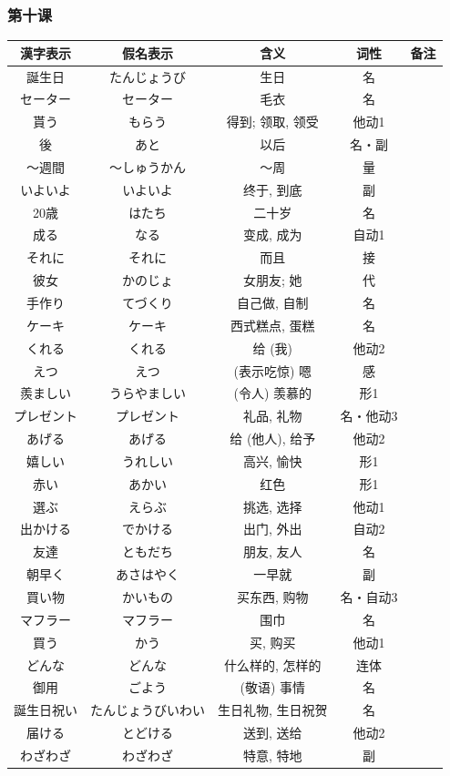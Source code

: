 \subsubsection{第十课}
\begin{longtable}{|c|c|c|c|c|}
    \hline
漢字表示 & 假名表示  & 含义 & 词性 & 备注 \\ \hline\hline  
誕生日 & たんじょうび & 生日 & 名 & \\ \hline
セーター & セーター & 毛衣 & 名 & \\ \hline
貰う & もらう & 得到; 领取, 领受 & 他动1 & \\ \hline
後 & あと & 以后 & 名・副 & \\ \hline
〜週間 & 〜しゅうかん & 〜周 & 量 & \\ \hline
いよいよ & いよいよ & 终于, 到底 & 副 & \\ \hline
20歳 & はたち & 二十岁 & 名 & \\ \hline
成る & なる & 变成, 成为 & 自动1 & \\ \hline
それに & それに & 而且 & 接 & \\ \hline
彼女 & かのじょ & 女朋友; 她 & 代 & \\ \hline
手作り & てづくり & 自己做, 自制 & 名 & \\ \hline
ケーキ & ケーキ & 西式糕点, 蛋糕 & 名 & \\ \hline
くれる & くれる & 给 (我) & 他动2 & \\ \hline
えつ & えつ & (表示吃惊) 嗯 & 感 & \\ \hline
羨ましい & うらやましい & (令人) 羡慕的 & 形1 & \\ \hline
プレゼント & プレゼント & 礼品, 礼物 & 名・他动3 & \\ \hline
あげる & あげる & 给 (他人), 给予 & 他动2 & \\ \hline
嬉しい & うれしい & 高兴, 愉快 & 形1 & \\ \hline
赤い & あかい & 红色 & 形1 & \\ \hline
選ぶ & えらぶ & 挑选, 选择 & 他动1 & \\ \hline
出かける & でかける & 出门, 外出 & 自动2 & \\ \hline
友達 & ともだち & 朋友, 友人 & 名 & \\ \hline
朝早く & あさはやく & 一早就 & 副 & \\ \hline
買い物 & かいもの & 买东西, 购物 & 名・自动3 & \\ \hline
マフラー & マフラー & 围巾 & 名 & \\ \hline
買う & かう & 买, 购买 & 他动1 & \\ \hline
どんな & どんな & 什么样的, 怎样的 & 连体 & \\ \hline
御用 & ごよう & (敬语) 事情 & 名 & \\ \hline
誕生日祝い & たんじょうびいわい & 生日礼物, 生日祝贺 & 名 & \\ \hline
届ける & とどける & 送到, 送给 & 他动2 & \\ \hline
わざわざ & わざわざ & 特意, 特地 & 副 & \\ \hline
\end{longtable}
